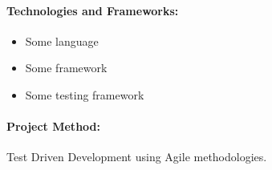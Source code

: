 \documentclass{article}
\begin{document}
\paragraph{Technologies and Frameworks:}
\label{par:Technologies and Frameworks}
\begin{itemize}
	\item Some language
	\item Some framework
	\item Some testing framework
\end{itemize}

\paragraph{Project Method:}
\label{par:Project Method}
Test Driven Development using Agile methodologies.
\end{document}
